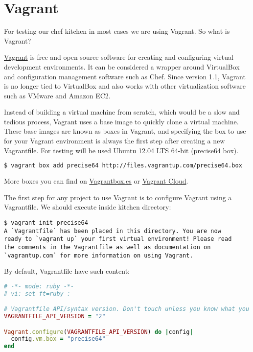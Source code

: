 \section{Vagrant}
\label{sec:solo-vagrant}

For testing our chef kitchen in most cases we are using Vagrant. So what is Vagrant?

\href{http://www.vagrantup.com/}{Vagrant} is free and open-source software for creating and configuring virtual development environments. It can be considered a wrapper around VirtualBox and configuration management software such as Chef. Since version 1.1, Vagrant is no longer tied to VirtualBox and also works with other virtualization software such as VMware and Amazon EC2.

Instead of building a virtual machine from scratch, which would be a slow and tedious process, Vagrant uses a base image to quickly clone a virtual machine. These base images are known as boxes in Vagrant, and specifying the box to use for your Vagrant environment is always the first step after creating a new Vagrantfile. For testing will be used Ubuntu 12.04 LTS 64-bit (precise64 box).

\begin{lstlisting}[language=Bash,label=lst:my-cloud-vagrant1]
$ vagrant box add precise64 http://files.vagrantup.com/precise64.box
\end{lstlisting}

More boxes you can find on \href{http://www.vagrantbox.es/}{Vagrantbox.es} or \href{https://vagrantcloud.com/}{Vagrant Cloud}.

The first step for any project to use Vagrant is to configure Vagrant using a Vagrantfile. We should execute  inside kitchen directory:

\begin{lstlisting}[label=lst:my-cloud-vagrant2]
$ vagrant init precise64
A `Vagrantfile` has been placed in this directory. You are now
ready to `vagrant up` your first virtual environment! Please read
the comments in the Vagrantfile as well as documentation on
`vagrantup.com` for more information on using Vagrant.
\end{lstlisting}

By default, Vagrantfile have such content:

\begin{lstlisting}[language=Ruby,label=lst:my-cloud-vagrant3,title=my-cloud/nodes/Vagrantfile]
# -*- mode: ruby -*-
# vi: set ft=ruby :

# Vagrantfile API/syntax version. Don't touch unless you know what you're doing!
VAGRANTFILE_API_VERSION = "2"

Vagrant.configure(VAGRANTFILE_API_VERSION) do |config|
  config.vm.box = "precise64"
end
\end{lstlisting}

